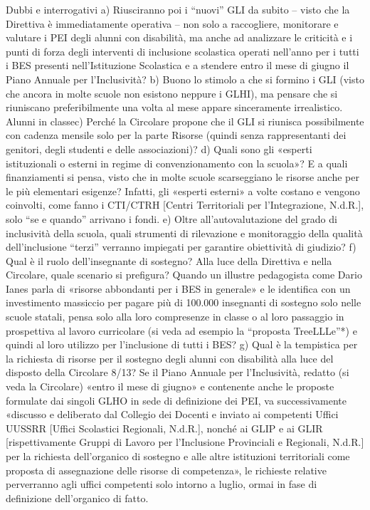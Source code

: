 Dubbi e interrogativi
a) Riusciranno poi i “nuovi” GLI da subito – visto che la Direttiva è immediatamente operativa – non solo a raccogliere, monitorare e valutare i PEI degli alunni con disabilità, ma anche ad analizzare le criticità e i punti di forza degli interventi di inclusione scolastica operati nell’anno per i tutti i BES presenti nell’Istituzione Scolastica e a stendere entro il mese di giugno il Piano Annuale per l’Inclusività?
b) Buono lo stimolo a che si formino i GLI (visto che ancora in molte scuole non esistono neppure i GLHI), ma pensare che si riuniscano preferibilmente una volta al mese appare sinceramente irrealistico.
Alunni in classec) Perché la Circolare propone che il GLI si riunisca possibilmente con cadenza mensile solo per la parte Risorse (quindi senza rappresentanti dei genitori, degli studenti e delle associazioni)?
d) Quali sono gli «esperti istituzionali o esterni in regime di convenzionamento con la scuola»? E a quali finanziamenti si pensa, visto che in molte scuole scarseggiano le risorse anche per le più elementari esigenze? Infatti, gli «esperti esterni» a volte costano e vengono coinvolti, come fanno i CTI/CTRH [Centri Territoriali per l’Integrazione, N.d.R.], solo “se e quando” arrivano i fondi.
e) Oltre all’autovalutazione del grado di inclusività della scuola, quali strumenti di rilevazione e monitoraggio della qualità dell’inclusione “terzi” verranno impiegati per garantire obiettività di giudizio?
f) Qual è il ruolo dell’insegnante di sostegno? Alla luce della Direttiva e nella Circolare, quale scenario si prefigura? Quando un illustre pedagogista come Dario Ianes parla di «risorse abbondanti per i BES in generale» e le identifica con un investimento massiccio per pagare più di 100.000 insegnanti di sostegno solo nelle scuole statali, pensa solo alla loro compresenze in classe o al loro passaggio in prospettiva al lavoro curricolare (si veda ad esempio la “proposta TreeLLLe”*) e quindi al loro utilizzo per l’inclusione di tutti i BES?
g) Qual è la tempistica per la richiesta di risorse per il sostegno degli alunni con disabilità alla luce del disposto della Circolare 8/13? Se il Piano Annuale per l’Inclusività, redatto (si veda la Circolare) «entro il mese di giugno» e contenente anche le proposte formulate dai singoli GLHO in sede di definizione dei PEI, va successivamente «discusso e deliberato dal Collegio dei Docenti e inviato ai competenti Uffici UUSSRR [Uffici Scolastici Regionali, N.d.R.], nonché ai GLIP e ai GLIR [rispettivamente Gruppi di Lavoro per l’Inclusione Provinciali e Regionali, N.d.R.] per la richiesta dell’organico di sostegno e alle altre istituzioni territoriali come proposta di assegnazione delle risorse di competenza», le richieste relative perverranno agli uffici competenti solo intorno a luglio, ormai in fase di definizione dell’organico di fatto.

